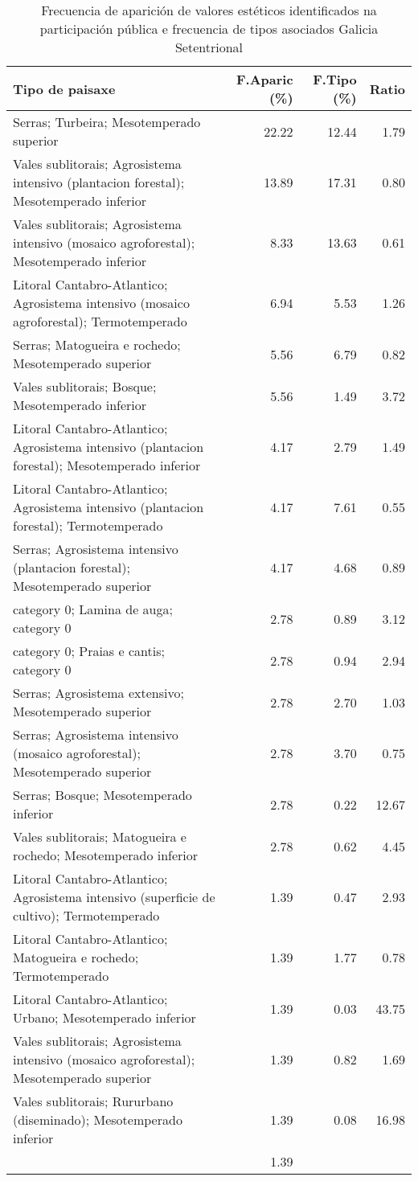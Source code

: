 \begin{table}[p]
\centering
\caption{Frecuencia de aparición de valores estéticos identificados na participación pública e frecuencia de tipos asociados Galicia Setentrional} 
\label{vsixotest10}
\begin{tabular}{lrrr}
  \hline
Tipo de paisaxe & F.Aparic (\%) & F.Tipo (\%) & Ratio \\ 
  \hline
Serras; Turbeira; Mesotemperado superior & 22.22 & 12.44 & 1.79 \\ 
  Vales sublitorais; Agrosistema intensivo (plantacion forestal); Mesotemperado inferior & 13.89 & 17.31 & 0.80 \\ 
  Vales sublitorais; Agrosistema intensivo (mosaico agroforestal); Mesotemperado inferior & 8.33 & 13.63 & 0.61 \\ 
  Litoral Cantabro-Atlantico; Agrosistema intensivo (mosaico agroforestal); Termotemperado & 6.94 & 5.53 & 1.26 \\ 
  Serras; Matogueira e rochedo; Mesotemperado superior & 5.56 & 6.79 & 0.82 \\ 
  Vales sublitorais; Bosque; Mesotemperado inferior & 5.56 & 1.49 & 3.72 \\ 
  Litoral Cantabro-Atlantico; Agrosistema intensivo (plantacion forestal); Mesotemperado inferior & 4.17 & 2.79 & 1.49 \\ 
  Litoral Cantabro-Atlantico; Agrosistema intensivo (plantacion forestal); Termotemperado & 4.17 & 7.61 & 0.55 \\ 
  Serras; Agrosistema intensivo (plantacion forestal); Mesotemperado superior & 4.17 & 4.68 & 0.89 \\ 
  category 0; Lamina de auga; category 0 & 2.78 & 0.89 & 3.12 \\ 
  category 0; Praias e cantis; category 0 & 2.78 & 0.94 & 2.94 \\ 
  Serras; Agrosistema extensivo; Mesotemperado superior & 2.78 & 2.70 & 1.03 \\ 
  Serras; Agrosistema intensivo (mosaico agroforestal); Mesotemperado superior & 2.78 & 3.70 & 0.75 \\ 
  Serras; Bosque; Mesotemperado inferior & 2.78 & 0.22 & 12.67 \\ 
  Vales sublitorais; Matogueira e rochedo; Mesotemperado inferior & 2.78 & 0.62 & 4.45 \\ 
  Litoral Cantabro-Atlantico; Agrosistema intensivo (superficie de cultivo); Termotemperado & 1.39 & 0.47 & 2.93 \\ 
  Litoral Cantabro-Atlantico; Matogueira e rochedo; Termotemperado & 1.39 & 1.77 & 0.78 \\ 
  Litoral Cantabro-Atlantico; Urbano; Mesotemperado inferior & 1.39 & 0.03 & 43.75 \\ 
  Vales sublitorais; Agrosistema intensivo (mosaico agroforestal); Mesotemperado superior & 1.39 & 0.82 & 1.69 \\ 
  Vales sublitorais; Rururbano (diseminado); Mesotemperado inferior & 1.39 & 0.08 & 16.98 \\ 
   & 1.39 &  &  \\ 
   \hline
\end{tabular}
\end{table}
